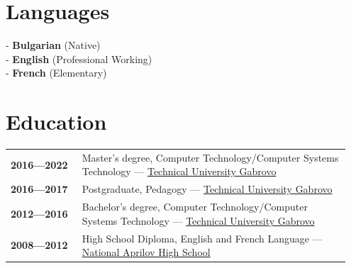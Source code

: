 \documentclass[letterpaper,10pt]{article}
\begin{document}
\begin{minipage}[t]{0.5\textwidth}
		
		\section*{Languages}
		
			- \textbf{Bulgarian} (Native)\\
			- \textbf{English} (Professional Working)\\
			- \textbf{French} (Elementary)
			
					\section*{Education}
			\begin{tabular}{@{}p{0.2\linewidth} p{0.75\linewidth}}
				\textbf{2016—2022} & Master's degree, Computer Technology/Computer Systems Technology — \href{https://www.tugab.bg/en/}{Technical University Gabrovo} \\
				\textbf{2016—2017} & Postgraduate, Pedagogy — \href{https://www.tugab.bg/en/}{Technical University Gabrovo} \\
				\textbf{2012—2016} & Bachelor's degree, Computer Technology/Computer Systems Technology — \href{https://www.tugab.bg/en/}{Technical University Gabrovo} \\
				\textbf{2008—2012} & High School Diploma, English and French Language — \href{https://nag-school.org/}{National Aprilov High School} \\
			\end{tabular}
		
	\end{minipage}
	\hfill
\end{document}
